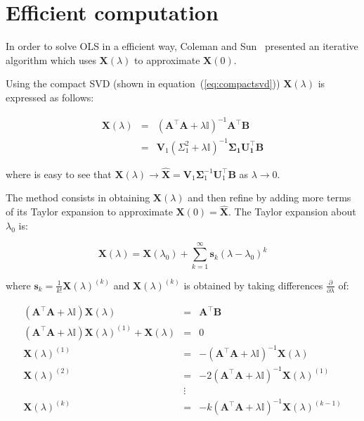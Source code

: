\section{Efficient computation}

In order to solve OLS in a efficient way, Coleman and
Sun~\cite{coleman+sun2010} presented an iterative algorithm which
uses $\mathbf{X}(\lambda)$ to approximate $\mathbf{X}(0)$.


Using the compact SVD (shown in equation~(\ref{eq:compactsvd}))
$\mathbf{X}(\lambda)$ is expressed as follows:


\begin{eqnarray}
\label{eq:optsolRRsvd}
\mathbf{X}(\lambda) & = & (\mathbf{A}^\top \mathbf{A}+ \lambda
\mathbb{I})^{-1}\mathbf{A}^\top \mathbf{B} \nonumber \\
& = &\mathbf{V}_1(\Sigma_1^2+\lambda \mathbb{I})^{-1}\mathbf{\Sigma_1
U_1^\top B}
\end{eqnarray}

\noindent where is easy to see that $\mathbf{X}(\lambda) \rightarrow
\mathbf{\hat{X}}=\mathbf{V}_1 \mathbf{\Sigma}_1^{-1}\mathbf{U}_1^\top
\mathbf{B}$ as $\lambda \rightarrow 0$. 

The method consists in obtaining $\mathbf{X}(\lambda)$ and then refine
by adding more terms of its Taylor expansion to approximate
$\mathbf{X}(0) = \mathbf{\hat{X}}$. The Taylor expansion about $\lambda_0$ is:

\begin{equation}
\label{eq:taylor}
    \mathbf{X}(\lambda)=\mathbf{X}(\lambda_0) + \sum_{k=1}^\infty
    \mathbf{s}_k(\lambda-\lambda_0)^{k}
\end{equation}


\noindent where $\mathbf{s}_k=\frac{1}{k!}\mathbf{X}(\lambda)^{(k)}$
and $\mathbf{X}(\lambda)^{(k)}$ is obtained by taking differences 
$\frac{\partial}{\partial \lambda}$ of:  

\begin{eqnarray*}
(\mathbf{A}^\top \mathbf{A}+ \lambda\mathbb{I}) \mathbf{X}(\lambda) & = & \mathbf{A}^\top \mathbf{B}\\
(\mathbf{A}^\top \mathbf{A}+ \lambda\mathbb{I}) \mathbf{X}(\lambda)^{(1)} + \mathbf{X}(\lambda)& = & 0 \\
\mathbf{X}(\lambda)^{(1)}  &=& -(\mathbf{A}^\top \mathbf{A}+ \lambda\mathbb{I}) ^{-1} \mathbf{X}(\lambda) \\
\mathbf{X}(\lambda)^{(2)}  &=& -2(\mathbf{A}^\top \mathbf{A}+ \lambda\mathbb{I}) ^{-1} \mathbf{X}(\lambda)^{(1)} \\
& \vdots & \\
\mathbf{X}(\lambda)^{(k)}  &=& -k(\mathbf{A}^\top \mathbf{A}+ \lambda\mathbb{I}) ^{-1} \mathbf{X}(\lambda)^{(k-1)} 
\end{eqnarray*}



